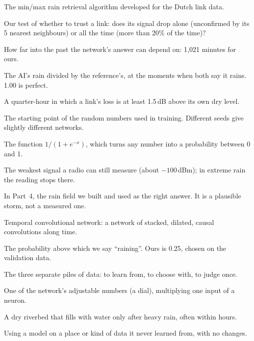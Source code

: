 \begin{description}[leftmargin=3.2cm,style=nextline,itemsep=0.25em]
\item[RAINLINK] The min/max rain retrieval algorithm developed for the Dutch link data.
\item[Reliability score] Our test of whether to trust a link: does its signal drop alone (unconfirmed by its 5 nearest neighbours) or all the time (more than 20\% of the time)?
\item[Receptive field] How far into the past the network's answer can depend on: 1{,}021 minutes for ours.
\item[Strength (of a run)] The AI's rain divided by the reference's, at the moments when both say it rains. 1.00 is perfect.
\item[Signal event] A quarter-hour in which a link's loss is at least 1.5\,dB above its own dry level.
\item[Seed] The starting point of the random numbers used in training. Different seeds give slightly different networks.
\item[Sigmoid] The function $1/(1+e^{-x})$, which turns any number into a probability between 0 and 1.
\item[Receiver floor] The weakest signal a radio can still measure (about $-100$\,dBm); in extreme rain the reading stops there.
\item[Simulated truth] In Part~4, the rain field we built and used as the right answer. It is a plausible storm, not a measured one.
\item[TCN] Temporal convolutional network: a network of stacked, dilated, causal convolutions along time.
\item[Threshold] The probability above which we say ``raining''. Ours is 0.25, chosen on the validation data.
\item[Training / validation / test] The three separate piles of data: to learn from, to choose with, to judge once.
\item[Weight] One of the network's adjustable numbers (a dial), multiplying one input of a neuron.
\item[Wadi] A dry riverbed that fills with water only after heavy rain, often within hours.
\item[Zero-shot] Using a model on a place or kind of data it never learned from, with no changes.
\end{description}
\normalsize

